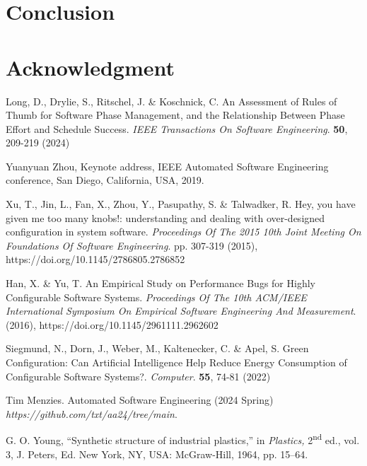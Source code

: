 \documentclass{ieeeaccess}
\begin{document}
\section{Conclusion}
\label{sec:conclusion}





\section*{Acknowledgment}





\begin{thebibliography}{00}



Long, D., Drylie, S., Ritschel, J. \& Koschnick, C. An Assessment of Rules of Thumb for Software Phase Management, and the Relationship Between Phase Effort and Schedule Success. {\em IEEE Transactions On Software Engineering}. \textbf{50}, 209-219 (2024)

 Yuanyuan Zhou, Keynote address, IEEE Automated Software Engineering conference, San Diego, California, USA, 2019. 

Xu, T., Jin, L., Fan, X., Zhou, Y., Pasupathy, S. \& Talwadker, R. Hey, you have given me too many knobs!: understanding and dealing with over-designed configuration in system software. {\em Proceedings Of The 2015 10th Joint Meeting On Foundations Of Software Engineering}. pp. 307-319 (2015), https://doi.org/10.1145/2786805.2786852

Han, X. \& Yu, T. An Empirical Study on Performance Bugs for Highly Configurable Software Systems. {\em Proceedings Of The 10th ACM/IEEE International Symposium On Empirical Software Engineering And Measurement}. (2016), https://doi.org/10.1145/2961111.2962602

Siegmund, N., Dorn, J., Weber, M., Kaltenecker, C. \& Apel, S. Green Configuration: Can Artificial Intelligence Help Reduce Energy Consumption of Configurable Software Systems?. {\em Computer}. \textbf{55}, 74-81 (2022)

 Tim Menzies. Automated Software Engineering (2024 Spring) \emph{https://github.com/txt/aa24/tree/main}. 

 G. O. Young, ``Synthetic structure of industrial plastics,'' in \emph{Plastics,} 2\textsuperscript{nd} ed., vol. 3, J. Peters, Ed. New York, NY, USA: McGraw-Hill, 1964, pp. 15--64.   


\end{thebibliography}
\end{document}

